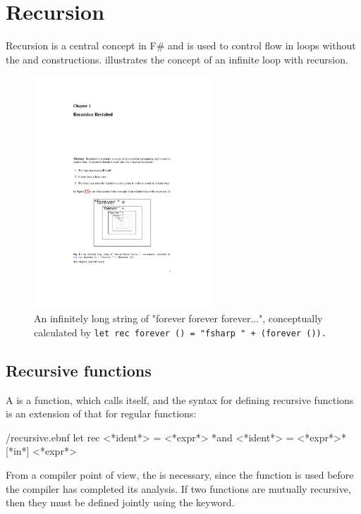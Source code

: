\chapter{Recursion}
\label{sec:recursion}
Recursion is a central concept in F\# and is used to control flow in loops without the  and  constructions.  illustrates the concept of an infinite loop with recursion. 
\begin{figure}[h] %
  \centering
  \includegraphics[width=0.6\textwidth]{recursion}
  \caption{An infinitely long string of "forever forever forever...", conceptually calculated by \mbox{\lstinline{let rec forever () = "fsharp " + (forever ()).}}}
  \label{fig:foreverRecursion}
\end{figure}

\section{Recursive functions}
A  is a function, which calls itself, and the syntax for defining recursive functions is an extension of that for regular functions:
%
\begin{verbatimwrite}{\ebnf/recursive.ebnf}
let rec <*ident*> = <*expr*> {*and <*ident*> = <*expr*>*} [*in*] <*expr*>
\end{verbatimwrite}
%
From a compiler point of view, the  is necessary, since the function is used before the compiler has completed its analysis. If two functions are mutually recursive, then they must be defined jointly using the  keyword.

